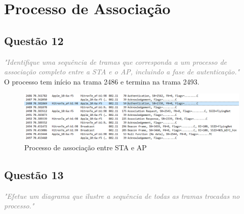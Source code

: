 \documentclass{llncs}
\newcommand{\questionE}[1]{\textcolor{gray}{\textit{"#1"}}}
\begin{document}
\clearpage

\section{Processo de Associação}

\subsection*{Questão 12}
\hspace{3mm} 
\questionE{Identifique uma sequência de tramas que corresponda a um processo de associação completo entre a STA e o AP, incluindo a fase de autenticação.}\\ 

O processo tem início na trama 2486 e termina na trama 2493. 

\begin{figure}[H]
\begin{center}
\includegraphics[width=12cm]{12.PNG}
\end{center}
\caption{Processo de associação entre STA e AP}
\end{figure}

\clearpage

\subsection*{Questão 13}
\hspace{3mm} 
\questionE{Efetue um diagrama que ilustre a sequência de todas as tramas trocadas no processo.}\\ 
\end{document}
